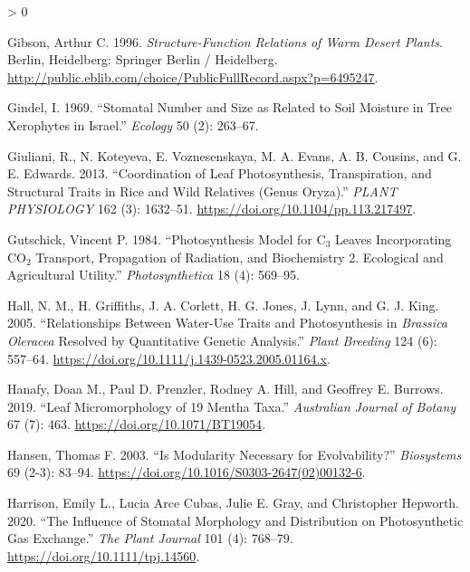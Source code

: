\documentclass[
  10pt,
]{article}
\newlength{\cslhangindent}
\newenvironment{CSLReferences}[2] %
 {%
  \setlength{\parindent}{0pt}
  \ifodd #1 \everypar{\setlength{\hangindent}{\cslhangindent}}\ignorespaces\fi
  \ifnum #2 > 0
  \setlength{\parskip}{#2\baselineskip}
  \fi
 }%
 {}
\begin{document}
\begin{CSLReferences}{1}{0}
\leavevmode\hypertarget{ref-gibson_structure-function_1996}{}%
Gibson, Arthur C. 1996. \emph{Structure-{Function} {Relations} of {Warm} {Desert} {Plants}}. Berlin, Heidelberg: Springer Berlin / Heidelberg. \url{http://public.eblib.com/choice/PublicFullRecord.aspx?p=6495247}.

\leavevmode\hypertarget{ref-gindel_stomatal_1969}{}%
Gindel, I. 1969. {``Stomatal Number and Size as Related to Soil Moisture in Tree Xerophytes in {Israel}.''} \emph{Ecology} 50 (2): 263--67.

\leavevmode\hypertarget{ref-giuliani_coordination_2013}{}%
Giuliani, R., N. Koteyeva, E. Voznesenskaya, M. A. Evans, A. B. Cousins, and G. E. Edwards. 2013. {``Coordination of {Leaf} {Photosynthesis}, {Transpiration}, and {Structural} {Traits} in {Rice} and {Wild} {Relatives} ({Genus} {Oryza}).''} \emph{PLANT PHYSIOLOGY} 162 (3): 1632--51. \url{https://doi.org/10.1104/pp.113.217497}.

\leavevmode\hypertarget{ref-gutschick_photosynthesis_1984}{}%
Gutschick, Vincent P. 1984. {``Photosynthesis Model for {C}\(_{\textrm{3}}\) Leaves Incorporating {CO}\(_{\textrm{2}}\) Transport, Propagation of Radiation, and Biochemistry 2. Ecological and Agricultural Utility.''} \emph{Photosynthetica} 18 (4): 569--95.

\leavevmode\hypertarget{ref-hall_relationships_2005}{}%
Hall, N. M., H. Griffiths, J. A. Corlett, H. G. Jones, J. Lynn, and G. J. King. 2005. {``Relationships Between Water-Use Traits and Photosynthesis in \emph{{Brassica} Oleracea} Resolved by Quantitative Genetic Analysis.''} \emph{Plant Breeding} 124 (6): 557--64. \url{https://doi.org/10.1111/j.1439-0523.2005.01164.x}.

\leavevmode\hypertarget{ref-hanafy_leaf_2019}{}%
Hanafy, Doaa M., Paul D. Prenzler, Rodney A. Hill, and Geoffrey E. Burrows. 2019. {``Leaf Micromorphology of 19 {Mentha} Taxa.''} \emph{Australian Journal of Botany} 67 (7): 463. \url{https://doi.org/10.1071/BT19054}.

\leavevmode\hypertarget{ref-hansen_is_2003}{}%
Hansen, Thomas F. 2003. {``Is Modularity Necessary for Evolvability?''} \emph{Biosystems} 69 (2-3): 83--94. \url{https://doi.org/10.1016/S0303-2647(02)00132-6}.

\leavevmode\hypertarget{ref-harrison_influence_2020}{}%
Harrison, Emily L., Lucia Arce Cubas, Julie E. Gray, and Christopher Hepworth. 2020. {``The Influence of Stomatal Morphology and Distribution on Photosynthetic Gas Exchange.''} \emph{The Plant Journal} 101 (4): 768--79. \url{https://doi.org/10.1111/tpj.14560}.


\end{CSLReferences}
\end{document}
